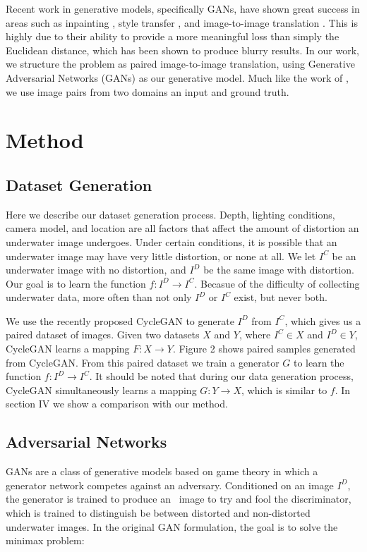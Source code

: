 \documentclass[conference,reqno]{IEEEtran}
\begin{document}
Recent work in generative models, specifically GANs, have shown great success
in areas such as inpainting \cite{pathak2016context}, style transfer \cite{Gatys_2016_CVPR}, and image-to-image
translation \cite{isola2016image,zhu2017unpaired}. This is highly due to their ability to provide a more meaningful
loss than simply the Euclidean distance, which has been shown to produce blurry results. In our work, we structure
the problem as paired image-to-image translation, using Generative Adversarial Networks (GANs) as our generative model.
Much like the work of \cite{isola2016image}, we use image pairs from two domains an input and ground truth.

\section{Method}

\subsection{Dataset Generation}
Here we describe our dataset generation process. Depth, lighting conditions, camera
model, and location are all factors that affect the amount of distortion an underwater image undergoes. Under certain
conditions, it is possible that an underwater image may have very little distortion, or none at all.
We let $I^C$ be an underwater image with no distortion, and $I^D$
be the same image with distortion. Our goal is to learn the function $f: I^D \rightarrow I^C$. Becasue of the
difficulty of collecting underwater data, more often than not only $I^D$ or $I^C$ exist, but never both.

We use the recently proposed CycleGAN \cite{zhu2017unpaired} to generate $I^D$ from $I^C$, which gives us a paired
dataset of images. Given two datasets $X$ and $Y$, where $I^C \in X$ and $I^D \in Y$, CycleGAN learns a mapping
$F: X \rightarrow Y$. Figure 2 shows paired samples generated from CycleGAN. From this paired dataset we train a
generator $G$ to learn the function $f: I^D \rightarrow I^C$. It should be noted that during our data generation process,
CycleGAN simultaneously learns a mapping $G: Y \rightarrow X$, which is similar to $f$. In section IV we show a comparison with our method.

\subsection{Adversarial Networks}
GANs \cite{goodfellow2014generative} are a class of generative models based on game theory in which a generator
network competes against an adversary. Conditioned on an image $I^D$, the generator is trained to produce an \
image to try and fool the discriminator, which is trained to distinguish be between distorted and non-distorted
underwater images. In the original GAN formulation, the goal is to solve the minimax problem: \newline
\end{document}
